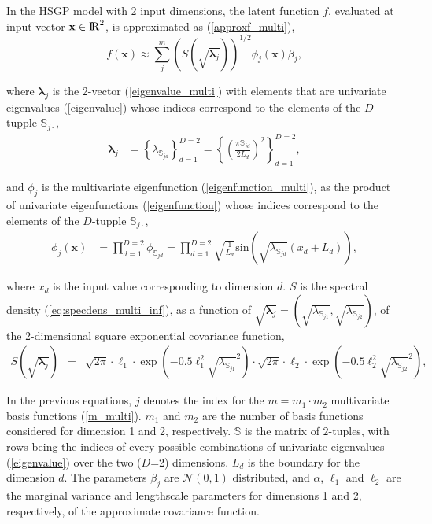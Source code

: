 \documentclass[]{interact}
\theoremstyle{plain}%
\theoremstyle{definition}
\theoremstyle{remark}
\begin{document}
In the HSGP model with 2 input dimensions, the latent function $f$, evaluated at input vector $\mathbf{x} \in {\rm I\!R}^2$, is approximated as (\ref{approxf_multi}),
%
\begin{equation*}
f(\mathbf{x}) \approx \sum_{j}^m \left( S(\sqrt{\boldsymbol{\lambda}_j})\right)^{1/2} \phi_j(\mathbf{x}) \beta_j,
\end{equation*}

\noindent where $\boldsymbol{\lambda}_j$ is the 2-vector (\ref{eigenvalue_multi}) with elements that are univariate eigenvalues (\ref{eigenvalue}) whose indices correspond to the elements of the $D$-tupple $\mathbb{S}_{j\cdotp}$,
%
\begin{align*}
\boldsymbol{\lambda}_j &= \left\{ \lambda_{\mathbb{S}_{jd}} \right\}_{d=1}^{D=2} = \left\{ \left(\tfrac{\pi \mathbb{S}_{jd}}{2L_d}\right)^2 \right\}_{d=1}^{D=2},
\end{align*}

\noindent and $\phi_j$ is the multivariate eigenfunction (\ref{eigenfunction_multi}), as the product of univariate eigenfunctions (\ref{eigenfunction}) whose indices correspond to the elements of the $D$-tupple $\mathbb{S}_{j\cdotp}$,
%
\begin{align*}
\phi_j(\mathbf{x}) &= \prod_{d=1}^{D=2} \phi_{\mathbb{S}_{jd}} = \prod_{d=1}^{D=2} \sqrt{\frac{1}{L_d}} \text{sin}\left(\sqrt{\lambda_{\mathbb{S}_{jd}}}(x_d+L_d)\right),
\end{align*}

\noindent where $x_d$ is the input value corresponding to dimension $d$. $S$ is the spectral density (\ref{eq:specdens_multi_inf}), as a function of $\sqrt{\boldsymbol{\lambda}_j}= \left(\sqrt{\lambda_{\mathbb{S}_{j1}}},\sqrt{\lambda_{\mathbb{S}_{j2}}} \right)$, of the 2-dimensional square exponential covariance function,
%
\begin{eqnarray*}
S(\sqrt{\boldsymbol{\lambda}_j})&=& \sqrt{2\pi} \cdot \ell_1 \cdot \exp\left(-0.5 \ell_1^2 \sqrt{\lambda_{\mathbb{S}_{j1}}}^2\right) \cdot  \sqrt{2\pi} \cdot \ell_2 \cdot \exp\left(-0.5 \ell_2^2 \sqrt{\lambda_{\mathbb{S}_{j2}}}^2\right) , 
\end{eqnarray*}

\noindent In the previous equations, $j$ denotes the index for the $m= m_1 \cdot m_2$ multivariate basis functions (\ref{m_multi}). $m_1$ and $m_2$ are the number of basis functions considered for dimension 1 and 2, respectively. $\mathbb{S}$ is the matrix of $2$-tuples, with rows being the indices of every possible combinations of univariate eigenvalues (\ref{eigenvalue}) over the two ($D$=2) dimensions. $L_d$ is the boundary for the dimension $d$. The parameters $\beta_j$ are $\mathcal{N}(0,1)$ distributed, and $\alpha$, $\ell_1$ and $\ell_2$ are the marginal variance and lengthscale parameters for dimensions 1 and 2, respectively, of the approximate covariance function.
\end{document}
